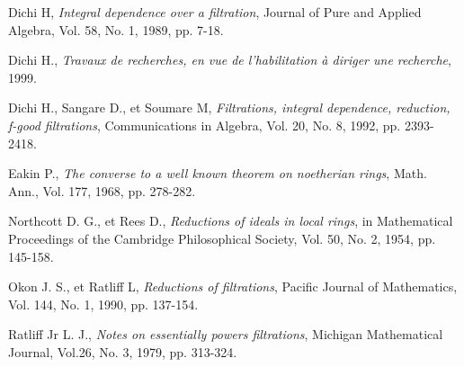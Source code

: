 \begin{thebibliography}{99}
	
	
	 Dichi H,\textit{ Integral dependence over a filtration}, Journal of Pure and Applied Algebra, Vol. 58, No. 1, 1989, pp. 7-18. 
	
	 Dichi H., \textit{Travaux de recherches, en vue de l'habilitation à diriger une recherche}, 1999.	
	
	 Dichi H., Sangare D., et Soumare M,\textit{ Filtrations, integral dependence, reduction, f-good filtrations}, Communications in Algebra, Vol. 20, No. 8, 1992, pp. 2393-2418.
	
	 Eakin P., \textit{The converse to a well known theorem on noetherian rings}, Math. Ann., Vol. 177, 1968, pp. 278-282.
	
	 Northcott D. G., et Rees D.,\textit{ Reductions of ideals in local rings}, in Mathematical Proceedings of the Cambridge Philosophical Society, Vol. 50, No. 2, 1954, pp. 145-158.
	
	 Okon J. S., et Ratliff L,\textit{ Reductions of filtrations}, Pacific Journal of Mathematics, Vol. 144, No. 1, 1990, pp. 137-154.
	
	 Ratliff Jr L. J.,\textit{ Notes on essentially powers filtrations}, Michigan Mathematical Journal, Vol.26, No. 3, 1979, pp. 313-324.

\end{thebibliography}
